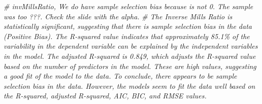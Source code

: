 \documentclass[
]{article}
\newenvironment{Shaded}{\begin{snugshade}}{\end{snugshade}}
\newcommand{\CommentTok}[1]{\textcolor[rgb]{0.56,0.35,0.01}{\textit{#1}}}
\begin{document}
\begin{Shaded}
\begin{Highlighting}[]
\CommentTok{\# invMillsRatio, We do have sample selection bias because is not 0. The sample was too ???. Check the slide with the alpha.}
\CommentTok{\# The Inverse Mills Ratio is statistically significant, suggesting that there is sample selection bias in the data (Positive Bias). The R{-}squared value indicates that approximately 85.1\% of the variability in the dependent variable can be explained by the independent variables in the model. The adjusted R{-}squared is 0.849, which adjusts the R{-}squared value based on the number of predictors in the model. These are high values, suggesting a good fit of the model to the data. To conclude, there appears to be sample selection bias in the data. However, the models seem to fit the data well based on the R{-}squared, adjusted R{-}squared, AIC, BIC, and RMSE values. }
\end{Highlighting}
\end{Shaded}
\end{document}

